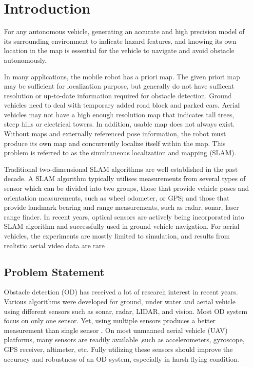 \chapter{Introduction} \label{ch:intro}
For any autonomous vehicle, generating an accurate and high precision
model of its surrounding environment to indicate hazard features, and
knowing its own location in the map is essential for the vehicle to
navigate and avoid obstacle autonomously.

In many applications, the mobile robot has a priori map. The given
priori map may be sufficient for localization purpose, but generally
do not have sufficent resolution or up-to-date information required
for obstacle detection. Ground vehicles need to deal with temporary
added road block and parked cars. Aerial vehicles may not have a high
enough resolution map that indicates tall trees, steep hills or
electrical towers. In addition, usable map does not always exist.
Without maps and externally referenced pose information, the robot
must produce its own map and concurrently localize itself within the
map. This problem is referred to as the simultaneous localization and
mapping (SLAM).

Traditional two-dimensional SLAM algorithms are well established in
the past decade. A SLAM algorithm typically utilises measurements from
several types of sensor which can be divided into two groups, those
that provide vehicle poses and orientation measurements, such as wheel
odometer, or GPS; and those that provide landmark bearing and range
measurements, such as radar, sonar, laser range finder. In recent
years, optical sensors are actively being incorporated into SLAM
algorithm and successfully used in ground vehicle navigation. For
aerial vehicles, the experiments are mostly limited to simulation, and
results from realistic aerial video data are rare
\cite{nemra_robust_2010} \cite{jianli_unscented_2011}
\cite{sunderhauf_using_2007} \cite{artieda_visual_2009}.

\section{Problem Statement}\label{section:ProblemStatement}
Obstacle detection (OD) has received a lot of research interest in
recent years. Various algorithms were developed for ground, under
water and aerial vehicle using different sensors such as sonar, radar,
LIDAR, and vision. Most OD system focus on only one sensor. Yet, using
multiple sensors produces a better measurement than single sensor
\cite{smith_approaches_2006}. On most unmanned aerial vehicle (UAV)
platforms, many sensors are readily available ,such as accelerometers,
gyroscope, GPS receiver, altimeter, etc. Fully utilizing these sensors
should improve the accuracy and robustness of an OD system, especially
in harsh flying condition.

